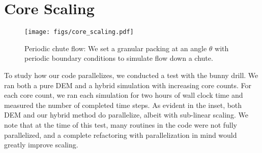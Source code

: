 \section{Core Scaling}
\begin{figure}
  \centering
  \texttt{[image: figs/core\_scaling.pdf]}
  \caption{
    Periodic chute flow: We set a granular packing at an angle $\theta$ with periodic boundary conditions to simulate flow down a chute.
  }
  \label{fig:hybrid:chute_flow}
\end{figure}

To study how our code parallelizes, we conducted a test with the bunny drill. We ran both a pure DEM and a hybrid simulation with increasing core counts. For each core count, we ran each simulation for two hours of wall clock time and measured the number of completed time steps. As evident in the inset, both DEM and our hybrid method do parallelize, albeit with sub-linear scaling. We note that at the time of this test, many routines in the code were not fully parallelized, and a complete refactoring with parallelization in mind would greatly improve scaling.


